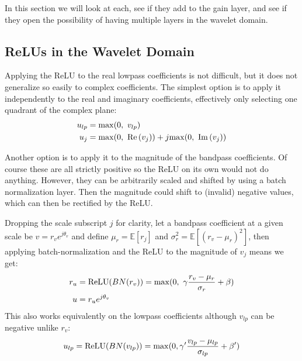 In this section we will look at each, see if they add to the gain
layer, and see if they open the possibility of having multiple layers in the
wavelet domain. 

\subsection{ReLUs in the Wavelet Domain}
Applying the ReLU to the real lowpass coefficients is not difficult, but it does
not generalize so easily to complex coefficients. The simplest option is to apply
it independently to the real and imaginary coefficients, effectively only
selecting one quadrant of the complex plane:
\begin{align}
  u_{lp} &= \mathrm{max}(0,\ v_{lp}) \\
  u_{j} &= \mathrm{max}(0,\ \mathrm{Re}\left(v_{j}\right)) + j\mathrm{max}(0,\ \mathrm{Im}\left(v_j\right)) \label{eq:ch6:relu_bp}
\end{align}

Another option is to apply it to the magnitude of the bandpass coefficients. Of
course these are all strictly positive so the ReLU on its own would not do
anything. However, they can be arbitrarily scaled and shifted by using a batch
normalization layer. Then the magnitude could shift to (invalid) negative
values, which can then be rectified by the ReLU. 

Dropping the scale
subscript $j$ for clarity, let a bandpass coefficient at a given scale be
$v = r_v e^{j\theta_v}$ and define
$\mu_r = \mathbb{E}[r_j]$ and $\sigma_r^2 = \mathbb{E}[(r_v-\mu_r)^2]$, then
applying batch-normalization and the ReLU to the magnitude of $v_j$ means we
get:
\begin{align}
  r_u &= \mathrm{ReLU}(BN(r_v)) = \max(0,\ \gamma \frac{r_v-\mu_r}{\sigma_r} + \beta) \label{eq:ch6:magrelu_bp} \\
  u &= r_u e^{j\theta_v} \label{eq:ch6:magrelu_bp2} 
\end{align}
This also works equivalently on the lowpass coefficients although $v_{lp}$ can
be negative unlike $r_v$:
\begin{equation}
  u_{lp} = \mathrm{ReLU}(BN(v_{lp})) = \max(0, \gamma' \frac{v_{lp} - \mu_{lp}}{\sigma_{lp}} + \beta') \label{eq:ch6:bnrelu_lp}
\end{equation}
%
